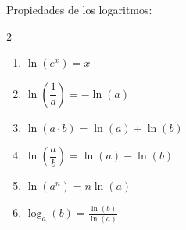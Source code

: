 \documentclass{article}
\begin{document}
{\large Propiedades de los logaritmos:}
\begin{multicols}{2}
  \begin{enumerate}
    \item $\ln(e^x) = x$
    \item $\ln\left(\dfrac{1}{a}\right) = -\ln(a)$
    \item $\ln(a\cdot b) = \ln(a)+\ln(b)$
    \item $\ln\left(\dfrac{a}{b}\right) = \ln(a)-\ln(b)$
    \item $\ln(a^n) = n\ln(a)$
    \item $\log_a(b) = \frac{\ln(b)}{\ln(a)}$
  \end{enumerate}
\end{multicols}
\vspace{2mm}

\end{document}
